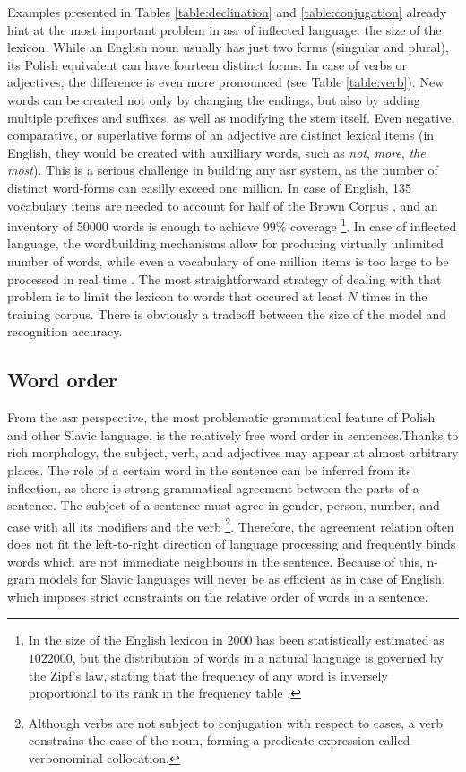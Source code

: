 Examples presented in Tables \ref{table:declination} and \ref{table:conjugation} already hint at the most important problem in \gls{asr} of inflected language: the size of the lexicon. While an English noun usually has just two forms (singular and plural), its Polish equivalent can have fourteen distinct forms. In case of verbs or adjectives, the difference is even more pronounced (see Table \ref{table:verb}). New words can be created not only by changing the endings, but also by adding multiple prefixes and suffixes, as well as modifying the stem itself. Even negative, comparative, or superlative forms of an adjective are distinct lexical items (in English, they would be created with auxilliary words, such as \textit{not}, \textit{more}, \textit{the most}). This is a serious challenge in building any \gls{asr} system, as the number of distinct word-forms can easilly exceed one million. In case of English, 135 vocabulary items are needed to account for half of the Brown Corpus \cite{fagan2011introduction}, and an inventory of 50000 words is enough to achieve 99\% coverage \footnote{In \cite{michel2011quantitative} the size of the English lexicon in 2000 has been statistically estimated as $1022000$, but the distribution of words in a natural language is governed by the Zipf's law, stating that the frequency of any word is inversely proportional to its rank in the frequency table \cite{li1992random}.}. In case of inflected language, the wordbuilding mechanisms allow for producing virtually unlimited number of words, while even a vocabulary of one million items is too large to be processed in real time \cite{nouza2010challenges}. The most straightforward strategy of dealing with that problem is to limit the lexicon to words that occured at least $N$ times in the training corpus. There is obviously a tradeoff between the size of the model and recognition accuracy.

\subsection{Word order}
From the \gls{asr} perspective, the most problematic grammatical feature of Polish and other Slavic language, is the relatively free word order in sentences.Thanks to rich morphology, the subject, verb, and adjectives may appear at almost arbitrary places. The role of a certain word in the sentence can be inferred from its inflection, as there is strong grammatical agreement between the parts of a sentence. The subject of a sentence must agree in gender, person, number, and case with all its modifiers and the verb \footnote{Although verbs are not subject to conjugation with respect to cases, a verb constrains the case of the noun, forming a predicate expression called verbonominal collocation\cite{vetulani2007towards}.}. Therefore, the agreement relation often does not fit the left-to-right direction of language processing and frequently binds words which are not immediate neighbours in the sentence. Because of this, n-gram models for Slavic languages will never be as efficient as in case of English, which imposes strict constraints on the relative order of words in a sentence.

